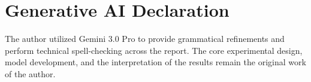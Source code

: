 \documentclass[10pt, a4paper]{article} %
\begin{document}
\section{Generative AI Declaration}

The author utilized Gemini 3.0 Pro \parencite{gemini2026} to provide grammatical refinements and perform technical spell-checking across the report. The core experimental design, model development, and the interpretation of the results remain the original work of the author.

\newpage
\printbibliography
\end{document}
